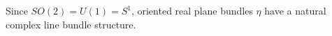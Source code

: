 Since $SO(2) = U(1) = S^1$, oriented real plane bundles $\eta$ have a natural complex line bundle structure.
